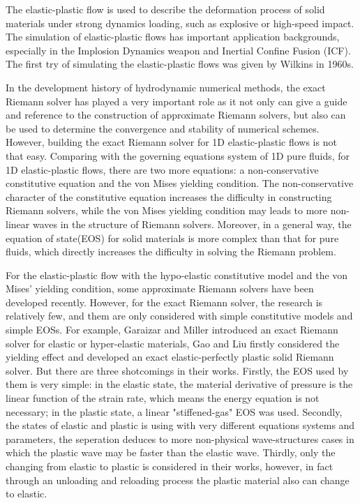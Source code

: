 \documentclass{article}
\numberwithin{equation}{section}
\numberwithin{table}{section}
\begin{document}
The  elastic-plastic flow  is  used to describe the deformation process of solid materials under strong dynamics loading, such as explosive or high-speed impact. The simulation of elastic-plastic flows has important application backgrounds, especially in the Implosion Dynamics weapon and Inertial Confine Fusion (ICF). The first try of simulating the elastic-plastic flows was given by  Wilkins \cite{wilkins1963calculation} in 1960s.

In the development history of hydrodynamic numerical methods, the exact Riemann solver has played a very important role {\color{red}as} it not only can give a guide and reference to the construction of approximate Riemann solvers, but also can be used to determine {\color{red}the convergence and stability of numerical schemes}. However, building the exact Riemann solver for 1D elastic-plastic flows is not that easy. Comparing with the governing equations system of 1D pure fluids, for 1D elastic-plastic flows, there are two more equations: a non-conservative constitutive equation and the von Mises yielding condition.  The non-conservative character of the constitutive equation increases the difficulty in constructing  Riemann solvers, while the von Mises yielding condition may leads to more non-linear waves in the structure of Riemann solvers. Moreover, in a general way, the equation of state(EOS) for solid materials is more complex than that for pure fluids, which directly increases the difficulty in solving the Riemann problem.

For the elastic-plastic flow with the hypo-elastic constitutive model and  the von Mises' yielding condition,  some approximate Riemann solvers\cite{gavrilyuk2008modelling,cheng2015high,cheng2016harten,liumulti}  {\color{red}have been developed recently. However, for the exact Riemann solver, the research is relatively few, and them are only considered with  simple constitutive models and simple EOSs.} For example, Garaizar \cite{garaizar1991solution} and Miller \cite{miller2004iterative} introduced  an exact Riemann solver for elastic or hyper-elastic materials, Gao and Liu \cite{gao20171d,gao2018complete} firstly considered the yielding effect and developed an exact elastic-perfectly plastic solid Riemann solver. But there are three shotcomings in their works. {\color{red}Firstly, the EOS used by them is very simple: in the elastic state, the material derivative of pressure is the linear function of the strain rate, which means the energy equation is not necessary; in the plastic state,  a linear  "stiffened-gas" EOS was used.  Secondly, the states of elastic and plastic is using with very different equations systems and parameters, the seperation  deduces to more non-physical wave-structures cases in which the plastic wave  may be faster than the elastic wave. Thirdly, only the changing from  elastic to plastic is considered in their works, however, in fact  through an unloading and reloading process the plastic material also can change to elastic.}
\end{document}

